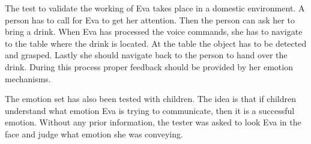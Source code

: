 \documentclass[project_eva.tex]{subfiles}
\begin{document}
The test to validate the working of Eva takes place in a domestic environment. A person has to call for Eva to get her attention. Then the person can ask her to bring a drink. When Eva has processed the voice commands, she has to navigate to the table where the drink is located. At the table the object has to be detected and grasped. Lastly she should navigate back to the person to hand over the drink. During this process proper feedback should be provided by her emotion mechanisms.

The emotion set has also been tested with children. The idea is that if children understand what emotion Eva is trying to communicate, then it is a successful emotion. Without any prior information, the tester was asked to look Eva in the face and judge what emotion she was conveying.
\end{document}
